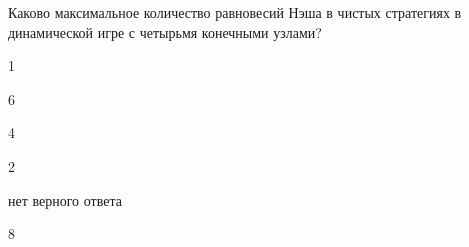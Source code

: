 
\begin{question}
Каково максимальное количество равновесий Нэша в чистых стратегиях в динамической игре с четырьмя конечными узлами?
\begin{answerlist}
  \item 1
  \item 6
  \item 4
  \item 2
  \item нет верного ответа
  \item 8
\end{answerlist}
\end{question}


